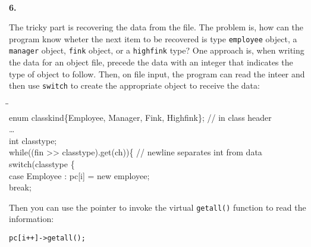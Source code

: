 \documentclass[10 pt]{amsart}
\newlength{\cwidth}
\newenvironment{cpart}[2][\cwidth]
	{%
		\\ %
		\textbf{#2. }%
		\begin{minipage}[t]{#1}%
		\setlength{\parindent}{0pt}%
		\setlength{\parskip}{2ex}%
	}
	{%
		\end{minipage}%
	}
\newcommand{\ttt}[1]{\texttt{#1}}
\begin{document}
\begin{cpart}{6}
		The tricky part is recovering the data from the file.
		The problem is, how can the program know wheter the next item
		to be recovered is type \ttt{employee} object, a \ttt{manager}
		object, \ttt{fink} object, or a \ttt{highfink} type?
		One approach is, when writing the data for an object file,
		precede the data with an integer that indicates the type of 
		object to follow.
		Then, on file input, the program can read the inteer and then 
		use \ttt{switch} to create the appropriate object to 
		receive the data:
		{\ttfamily
			\begin{tabbing}
				\phantom{\qquad}\=\phantom{\qquad}\=\phantom{\qquad}\= \\
				enum classkind\{Employee, Manager, Fink, Highfink\};
					// in class header \\
				\ldots \\
				int classtype; \\
				while((fin >> classtype).get(ch))\{
					// newline separates int from data \\
				\> 	switch(classtype \{ \\
				\> \> 		case Employee : pc[i] = new employee; \\
				\> \> 		\phantom{case Employee : }break;
			\end{tabbing}
		}
		Then you can use the pointer to invoke the virtual \ttt{getall()}
		function to read the information: 

		\ttt{pc[i++]->getall();}
	\end{cpart}
\end{document}

